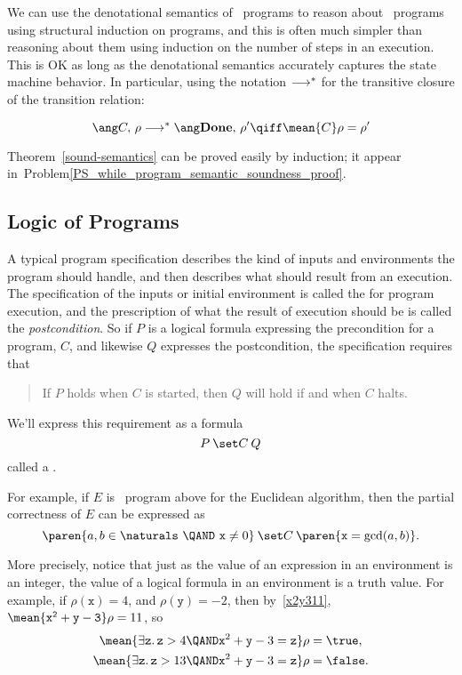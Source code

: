 We can use the denotational semantics of \while\ programs to reason about
\while\ programs using structural induction on programs, and this is often
much simpler than reasoning about them using induction on the number of
steps in an execution.  This is OK as long as the denotational semantics
accurately captures the state machine behavior.  In particular, using the
notation $\mathrel{\longrightarrow}^*$ for the transitive closure of the transition
relation:
\begin{theorem}\label{sound-semantics}
\[
\haltswith{C}{\rho}{\rho'} \qiff \mean{C}\rho = \rho'
\]
\end{theorem}
Theorem~\ref{sound-semantics} can be proved easily by induction; it
appear in~Problem\ref{PS_while_program_semantic_soundness_proof}.

\begin{problems}
\homeworkproblems
{}
\end{problems}

\subsection{Logic of Programs}

A typical program specification describes the kind of inputs and
environments the program should handle, and then describes what should
result from an execution.  The specification of the inputs or initial
environment is called the  for program execution, and
the prescription of what the result of execution should be is called the
\emph{postcondition}.  So if $P$ is a logical formula expressing the precondition
for a program, $C$, and likewise $Q$ expresses the postcondition, the
specification requires that
\begin{quote}
If $P$ holds when $C$ is started, then $Q$ will hold if and when $C$ halts.
\end{quote}
We'll express this requirement as a formula
\[
\after{P}{C}{Q}
\]
called a .

For example, if $E$ is \while\ program above for the Euclidean
algorithm, then the partial correctness of $E$ can be expressed as
\begin{equation}\label{eucpc}
\after{\paren{a, b \in \naturals\ \QAND\  \mathtt{x} \neq 0}}{C}
                   {\paren{\mathtt{x} = \gcd(a,b)}}.
\end{equation}

More precisely, notice that just as the value of an expression in an
environment is an integer, the value of a logical formula in an
environment is a truth value.  For example, if $\rho(\mathtt{x}) =4$,
and $\rho(\mathtt{y}) =-2$, then by~\eqref{x2y311},
$\mean{\mathtt{x^2+y -3}}\rho = 11$, so
\begin{align*}
\mean{\exists \mathtt{z}.\, \mathtt{z} > 4 \QAND \mathtt{x}^2+\mathtt{y} -3=\mathtt{z}}\rho & = \true,\\
\mean{\exists \mathtt{z}.\, \mathtt{z} > 13 \QAND \mathtt{x}^2+\mathtt{y} -3=\mathtt{z}}\rho & = \false.
\end{align*}

